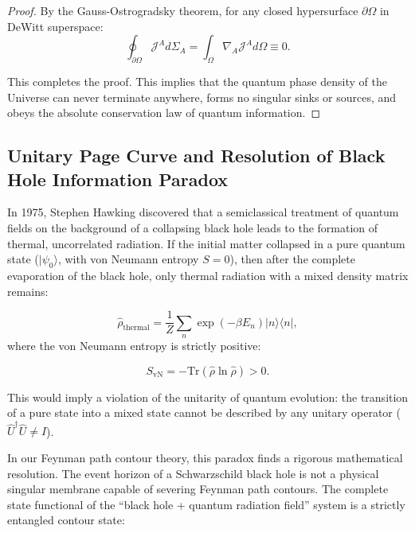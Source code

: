 \begin{proof}
By the Gauss-Ostrogradsky theorem, for any closed hypersurface $\partial\Omega$ in DeWitt superspace:
\begin{equation}\label{eq:1.105}\tag{1.105}
\oint_{\partial\Omega} \mathcal{J}^A d\Sigma_A = \int_\Omega \nabla_A \mathcal{J}^A d\Omega \equiv 0.
\end{equation}

This completes the proof. This implies that the quantum phase density of the Universe can never terminate anywhere, forms no singular sinks or sources, and obeys the absolute conservation law of quantum information.
\end{proof}

\subsection{Unitary Page Curve and Resolution of Black Hole Information Paradox}\label{sec:1.5}

In 1975, Stephen Hawking discovered that a semiclassical treatment of quantum fields on the background of a collapsing black hole leads to the formation of thermal, uncorrelated radiation. If the initial matter collapsed in a pure quantum state ($|\psi_0\rangle$, with von Neumann entropy $S = 0$), then after the complete evaporation of the black hole, only thermal radiation with a mixed density matrix remains:

\begin{equation}\label{eq:1.106}\tag{1.106}
\hat{\rho}_{\text{thermal}} = \frac{1}{Z} \sum_n \exp(-\beta E_n) |n\rangle \langle n|,
\end{equation}
where the von Neumann entropy is strictly positive:

\begin{equation}\label{eq:1.107}\tag{1.107}
S_{\text{vN}} = -\text{Tr}(\hat{\rho}\ln\hat{\rho}) > 0.
\end{equation}

This would imply a violation of the unitarity of quantum evolution: the transition of a pure state into a mixed state cannot be described by any unitary operator ($\hat{U}^\dagger \hat{U} \ne \hat{I}$).

In our Feynman path contour theory, this paradox finds a rigorous mathematical resolution. The event horizon of a Schwarzschild black hole is not a physical singular membrane capable of severing Feynman path contours. The complete state functional of the ``black hole + quantum radiation field'' system is a strictly entangled contour state:

